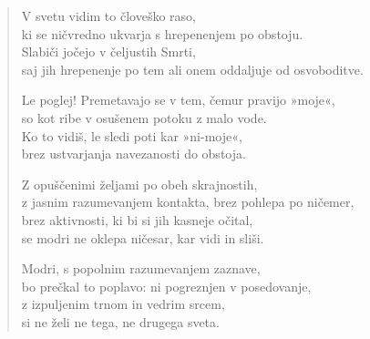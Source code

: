 
\clearpage
\begin{verse}

V svetu vidim to človeško raso,\\
ki se ničvredno ukvarja s hrepenenjem po obstoju.\\
Slabiči jočejo v čeljustih Smrti,\\
saj jih hrepenenje po tem ali onem oddaljuje od osvoboditve.

Le poglej! Premetavajo se v tem, čemur pravijo »moje«,\\
so kot ribe v osušenem potoku z malo vode.\\
Ko to vidiš, le sledi poti kar »ni-moje«,\\
brez ustvarjanja navezanosti do obstoja.

Z opuščenimi željami po obeh skrajnostih,\\
z jasnim razumevanjem kontakta, brez pohlepa po ničemer,\\
brez aktivnosti, ki bi si jih kasneje očital,\\
se modri ne oklepa ničesar, kar vidi in sliši.

Modri, s popolnim razumevanjem zaznave,\\
bo prečkal to poplavo: ni pogreznjen v posedovanje,\\
z izpuljenim trnom in vedrim srcem,\\
si ne želi ne tega, ne drugega sveta.

\end{verse}

